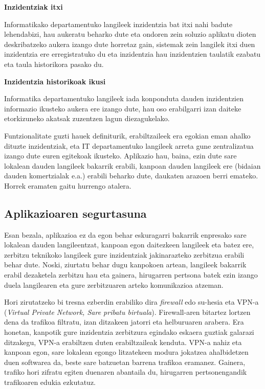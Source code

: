 \textbf{Inzidentziak itxi}

Informatikako departamentuko langileek inzidentzia bat itxi nahi badute lehendabizi, hau aukeratu beharko dute eta ondoren zein soluzio aplikatu dioten deskribatzeko aukera izango dute horretaz gain, sistemak zein langilek itxi duen inzidentzia ere erregistratuko du eta inzidentzia hau inzidentzien taulatik ezabatu eta taula historikora pasako du.

\textbf{Inzidentzia historikoak ikusi}

Informatika departamentuko langileek iada konponduta dauden inzidentzien informazio ikusteko aukera ere izango dute, hau oso erabilgarri izan daiteke etorkizuneko akatsak zuzentzen lagun diezagukelako.


Funtzionalitate guzti hauek definiturik, erabiltzaileek era egokian eman ahalko dituzte inzidentziak, eta IT departamentuko langileek arreta gune zentralizatua izango dute euren egitekoak ikusteko. Aplikazio hau, baina, ezin dute sare lokalean dauden langileek bakarrik erabili, kanpoan dauden langileek ere (bidaian dauden komertzialak e.a.) erabili beharko dute, daukaten arazoen berri emateko. Horrek eramaten gaitu hurrengo atalera.

\subsection{Aplikazioaren segurtasuna}
\label{sec:asec}
Esan bezala, aplikazioa ez da egon behar eskuragarri bakarrik enpresako sare lokalean dauden langileentzat, kanpoan egon daitezkeen langileek eta batez ere, zerbitzu teknikoko langileek gure inzidentziak jakinarazteko zerbitzua erabili behar dute. Noski, ziurtatu behar dugu kanpokoen artean, langileek bakarrik erabil dezaketela zerbitzu hau eta gainera, hirugarren pertsona batek ezin izango duela langilearen eta gure zerbitzuaren arteko komunikazioa atzeman.

Hori zirutatzeko bi tresna ezberdin erabiliko dira \textit{firewall} edo su-hesia eta VPN-a (\textit{Virtual Private Network, Sare pribatu birtuala}). Firewall-aren bitartez lortzen dena da trafikoa filtratu, izan ditzakeen jatorri eta helburuaren arabera. Era honetan, kanpotik gure inzidentzia zerbitzura egindako eskaera guztiak galarazi ditzakegu, VPN-a erabiltzen duten erabiltzaileak kenduta. VPN-a nahiz eta kanpoan egon, sare lokalean egongo litzatekeen modura jokatzea ahalbidetzen duen softwarea da, beste sare batzuetan barrena trafikoa eramanez. Gainera, trafiko hori zifratu egiten duenaren abantaila du, hirugarren pertsonengandik trafikoaren edukia ezkutatuz.

